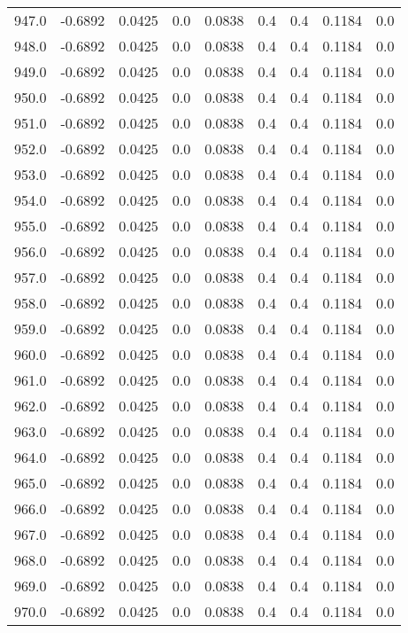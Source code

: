 \begin{longtable}{lrrrrrrrr}
947.0 & -0.6892 & 0.0425 & 0.0 & 0.0838 & 0.4 & 0.4 & 0.1184 & 0.0 \\
948.0 & -0.6892 & 0.0425 & 0.0 & 0.0838 & 0.4 & 0.4 & 0.1184 & 0.0 \\
949.0 & -0.6892 & 0.0425 & 0.0 & 0.0838 & 0.4 & 0.4 & 0.1184 & 0.0 \\
950.0 & -0.6892 & 0.0425 & 0.0 & 0.0838 & 0.4 & 0.4 & 0.1184 & 0.0 \\
951.0 & -0.6892 & 0.0425 & 0.0 & 0.0838 & 0.4 & 0.4 & 0.1184 & 0.0 \\
952.0 & -0.6892 & 0.0425 & 0.0 & 0.0838 & 0.4 & 0.4 & 0.1184 & 0.0 \\
953.0 & -0.6892 & 0.0425 & 0.0 & 0.0838 & 0.4 & 0.4 & 0.1184 & 0.0 \\
954.0 & -0.6892 & 0.0425 & 0.0 & 0.0838 & 0.4 & 0.4 & 0.1184 & 0.0 \\
955.0 & -0.6892 & 0.0425 & 0.0 & 0.0838 & 0.4 & 0.4 & 0.1184 & 0.0 \\
956.0 & -0.6892 & 0.0425 & 0.0 & 0.0838 & 0.4 & 0.4 & 0.1184 & 0.0 \\
957.0 & -0.6892 & 0.0425 & 0.0 & 0.0838 & 0.4 & 0.4 & 0.1184 & 0.0 \\
958.0 & -0.6892 & 0.0425 & 0.0 & 0.0838 & 0.4 & 0.4 & 0.1184 & 0.0 \\
959.0 & -0.6892 & 0.0425 & 0.0 & 0.0838 & 0.4 & 0.4 & 0.1184 & 0.0 \\
960.0 & -0.6892 & 0.0425 & 0.0 & 0.0838 & 0.4 & 0.4 & 0.1184 & 0.0 \\
961.0 & -0.6892 & 0.0425 & 0.0 & 0.0838 & 0.4 & 0.4 & 0.1184 & 0.0 \\
962.0 & -0.6892 & 0.0425 & 0.0 & 0.0838 & 0.4 & 0.4 & 0.1184 & 0.0 \\
963.0 & -0.6892 & 0.0425 & 0.0 & 0.0838 & 0.4 & 0.4 & 0.1184 & 0.0 \\
964.0 & -0.6892 & 0.0425 & 0.0 & 0.0838 & 0.4 & 0.4 & 0.1184 & 0.0 \\
965.0 & -0.6892 & 0.0425 & 0.0 & 0.0838 & 0.4 & 0.4 & 0.1184 & 0.0 \\
966.0 & -0.6892 & 0.0425 & 0.0 & 0.0838 & 0.4 & 0.4 & 0.1184 & 0.0 \\
967.0 & -0.6892 & 0.0425 & 0.0 & 0.0838 & 0.4 & 0.4 & 0.1184 & 0.0 \\
968.0 & -0.6892 & 0.0425 & 0.0 & 0.0838 & 0.4 & 0.4 & 0.1184 & 0.0 \\
969.0 & -0.6892 & 0.0425 & 0.0 & 0.0838 & 0.4 & 0.4 & 0.1184 & 0.0 \\
970.0 & -0.6892 & 0.0425 & 0.0 & 0.0838 & 0.4 & 0.4 & 0.1184 & 0.0 \\

\end{longtable}
